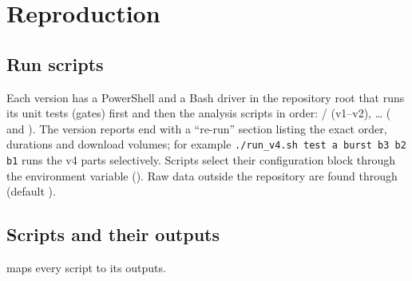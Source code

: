 \chapter{Reproduction}\label{app:reproduction}

\section{Run scripts}
Each version has a PowerShell and a Bash driver in the repository root that runs its unit tests (gates) first and then the analysis
scripts in order: / (v1--v2),  \dots{}  ( and ). The
version reports end with a ``re-run'' section listing the exact order, durations and download volumes; for example
\verb|./run_v4.sh test a burst b3 b2 b1| runs the v4 parts selectively. Scripts select their configuration block through the
environment variable  (). Raw data outside the repository are found through
 (default ).

\section{Scripts and their outputs}
 maps every script to its outputs.

